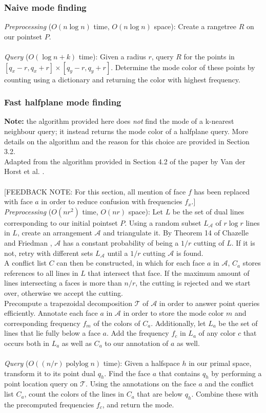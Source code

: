 \documentclass{article}
\newcommand{\fb}[1]{{\color{blue}#1}}
\newcommand{\fbnote}[1]{{\color{blue}[FEEDBACK NOTE: #1]\\}}
\DeclareMathOperator{\polylog}{polylog}
\begin{document}
\subsubsection{Naive mode finding}
\fb{
\textit{Preprocessing} ($O(n \log n)$ time, $O(n \log n)$ space): Create a rangetree $R$ on our pointset $P$. \\\\
\textit{Query} ($O(\log n + k)$ time): Given a radius $r$, query $R$ for the points in $[q_x - r, q_x + r] \times [q_y - r, q_y + r]$. Determine the mode color of these points by counting using a dictionary and returning the color with highest frequency. 
}
\subsubsection{Fast halfplane mode finding}
\textbf{Note: } the algorithm provided here does \textit{not} find the mode of a k-nearest neighbour query; it instead returns the mode color of a halfplane query. More details on the algorithm and the reason for this choice are provided in Section 3.2. \\
Adapted from the algorithm provided in Section 4.2 of the paper by Van der Horst et al. \cite{vanderhorst_et_al:LIPIcs.ESA.2022.67}. \\\\
\fbnote{For this section, all mention of face $f$ has been replaced with face $a$ in order to reduce confusion with frequencies $f_x$.}
\textit{Preprocessing} ($O(nr^2)$ time, $O(nr)$ space): Let $L$ be the set of dual lines corresponding to our initial pointset $P$. \fb{Using a random subset $L_{\mathcal{A}}$ of $r \log r$ lines in $L$, create an arrangement $\mathcal{A}$ and triangulate it. By Theorem 14 of Chazelle and Friedman \cite{21970}, $\mathcal{A}$ has a constant probability of being a $1/r$ cutting of $L$. If it is not, retry with different sets $L_{\mathcal{A}}$ until a $1/r$ cutting $\mathcal{A}$ is found.}\\ A conflict list $C$ can then be constructed, in which for each face $a$ in $\mathcal{A}$, $C_a$ stores references to all lines in $L$ that intersect that face. If the maximum amount of lines intersecting a faces is more than $n/r$, the cutting is rejected and we start over, otherwise we accept the cutting. \\
\fb{Precompute a trapezoidal decomposition $\mathcal{T}$ of $\mathcal{A}$ in order to answer point queries efficiently. Annotate each face $a$ in $\mathcal{A}$ in order to store the mode color $m$ and corresponding frequency $f_m$ of the colors of $C_a$. Additionally, let $L_a$ be the set of lines that lie fully below a face $a$. Add the frequency $f_c$ in $L_a$ of any color $c$ that occurs both in $L_a$ as well as $C_a$ to our annotation of $a$ as well.}\\\\
\textit{Query} ($O((n/r) \polylog n)$ time): Given a halfspace $h$ in our primal space, transform it to its point dual $q_h$. Find the face $a$ that contains $q_h$ by performing a point location query on $\mathcal{T}$. Using the annotations on the face $a$ and the conflict list $C_a$, count the colors of the lines in $C_a$ that are below $q_h$. Combine these with the precomputed frequencies $f_c$, and return the mode.
\end{document}
